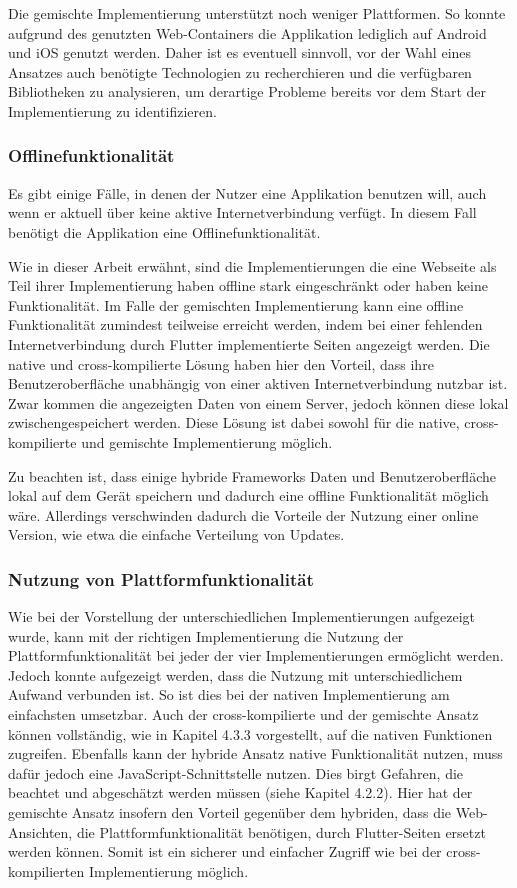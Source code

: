 Die gemischte Implementierung unterstützt noch weniger Plattformen. So konnte aufgrund des genutzten Web-Containers die Applikation lediglich auf Android und iOS genutzt werden.
Daher ist es eventuell sinnvoll, vor der Wahl eines Ansatzes auch benötigte Technologien zu recherchieren und die verfügbaren Bibliotheken zu analysieren, um derartige Probleme bereits vor dem Start der Implementierung zu identifizieren.


\subsubsection{Offlinefunktionalität}
Es gibt einige Fälle, in denen der Nutzer eine Applikation benutzen will, auch wenn er aktuell über keine aktive Internetverbindung verfügt. In diesem Fall benötigt die Applikation eine Offlinefunktionalität.

Wie in dieser Arbeit erwähnt, sind die Implementierungen die eine Webseite als Teil ihrer Implementierung haben offline stark eingeschränkt oder haben keine Funktionalität. Im Falle der gemischten Implementierung kann eine offline Funktionalität zumindest teilweise erreicht werden, indem bei einer fehlenden Internetverbindung durch Flutter implementierte Seiten angezeigt werden. Die native und cross-kompilierte Lösung haben hier den Vorteil, dass ihre Benutzeroberfläche unabhängig von einer aktiven Internetverbindung nutzbar ist. Zwar kommen die angezeigten Daten von einem Server, jedoch können diese lokal zwischengespeichert werden. Diese Lösung ist dabei sowohl für die native, cross-kompilierte und gemischte Implementierung möglich. 

Zu beachten ist, dass einige hybride Frameworks Daten und Benutzeroberfläche lokal auf dem Gerät speichern und dadurch eine offline Funktionalität möglich wäre. Allerdings verschwinden dadurch die Vorteile der Nutzung einer online Version, wie etwa die einfache Verteilung von Updates.

\subsubsection{Nutzung von Plattformfunktionalität}
Wie bei der Vorstellung der unterschiedlichen Implementierungen aufgezeigt wurde, kann mit der richtigen Implementierung die Nutzung der Plattformfunktionalität bei jeder der vier Implementierungen ermöglicht werden. Jedoch konnte aufgezeigt werden, dass die Nutzung mit unterschiedlichem Aufwand verbunden ist. So ist dies bei der nativen Implementierung am einfachsten umsetzbar. Auch der cross-kompilierte und der gemischte Ansatz können vollständig, wie in Kapitel 4.3.3 vorgestellt, auf die nativen Funktionen zugreifen. Ebenfalls kann der hybride Ansatz native Funktionalität nutzen, muss dafür jedoch eine JavaScript-Schnittstelle nutzen. Dies birgt Gefahren, die beachtet und abgeschätzt werden müssen (siehe Kapitel 4.2.2). Hier hat der gemischte Ansatz insofern den Vorteil gegenüber dem hybriden, dass die Web-Ansichten, die Plattformfunktionalität benötigen, durch Flutter-Seiten ersetzt werden können. Somit ist ein sicherer und einfacher Zugriff wie bei der cross-kompilierten Implementierung möglich.
